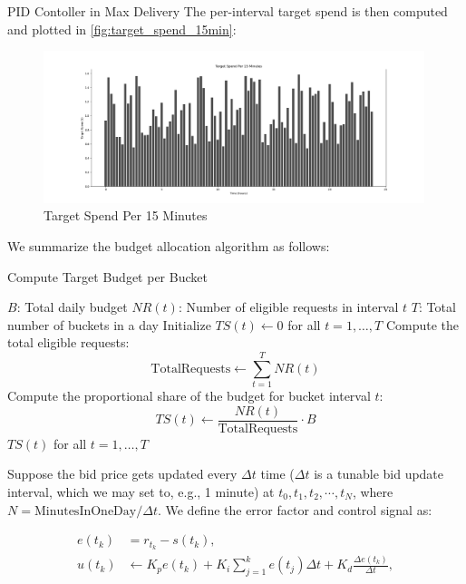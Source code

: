 \documentclass[../main.tex]{subfiles}
\begin{document}
\begin{section}{PID Contoller in Max Delivery}
		The per-interval target spend is then computed and plotted in \autoref{fig:target_spend_15min}:
		
		\begin{figure}[H]
			\centering
			\includegraphics[width=0.99\textwidth]{../Images/target_spend_15min.png}
			\caption{Target Spend Per 15 Minutes}
			\label{fig:target_spend_15min}
		\end{figure}
	
	We summarize the budget allocation algorithm as follows:
	
		\begin{algorithm}[H]
		\caption{Compute Target Budget per Bucket}
		\begin{algorithmic}[1]
			\Require $B$: Total daily budget
			\Require $NR(t)$: Number of eligible requests in interval $t$
			\Require $T$: Total number of buckets in a day
			\State Initialize $TS(t) \gets 0$ for all $t = 1, \dots, T$
			\State Compute the total eligible requests:
			\[
			\text{TotalRequests} \gets \sum_{t=1}^{T} NR(t)
			\]
			\State Compute the proportional share of the budget for bucket interval $t$:
			\[
			TS(t) \gets \frac{NR(t)}{\text{TotalRequests}} \cdot B
			\]
			\EndFor
			\State \Return $TS(t)$ for all $t = 1, \dots, T$
		\end{algorithmic}
	\end{algorithm}
	
		Suppose the bid price gets updated every \(\Delta t\) time (\(\Delta t\) is a tunable bid update interval, which we may set to, e.g., 1 minute) at \(t_0, t_1, t_2, \cdots, t_N\), where \(N = \text{MinutesInOneDay} / \Delta t\). We define the error factor and control signal as:
		
		\[
		\begin{aligned}
			e(t_k) &= r_{t_k} - s(t_k), \\
			u(t_{k}) &\gets K_p e(t_k) + K_i \sum_{j=1}^{k} e(t_j) \Delta t + K_d \frac{\Delta e(t_k)}{\Delta t},
		\end{aligned}
		\]
		

\end{section}
\end{document}
